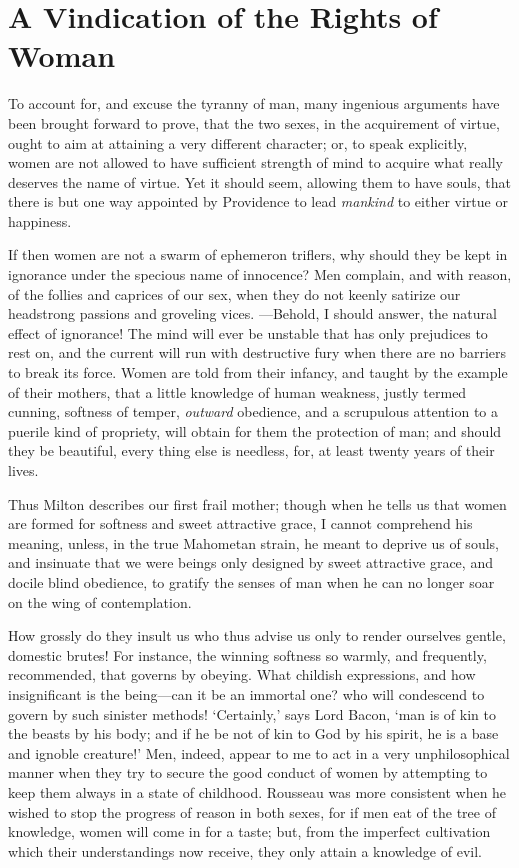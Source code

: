 
\author{Mary Wollstonecraft}
\chapter[A Vindication of the Rights of Woman, chap. 2]{A Vindication
of the Rights of Woman}

To account for, and excuse the tyranny of man, many ingenious
arguments have been brought forward to prove, that the two sexes, in
the acquirement of virtue, ought to aim at attaining a very different
character; or, to speak explicitly, women are not allowed to have
sufficient strength of mind to acquire what really deserves the name
of virtue. Yet it should seem, allowing them to have souls, that there
is but one way appointed by Providence to lead \textit{mankind} to
either virtue or happiness.

If then women are not a swarm of ephemeron triflers, why should they
be kept in ignorance under the specious name of innocence? Men
complain, and with reason, of the follies and caprices of our sex,
when they do not keenly satirize our headstrong passions and groveling
vices.  ---Be\-hold, I should answer, the natural effect of
ignorance! The mind will ever be unstable that has only prejudices to
rest on, and the current will run with destructive fury when there are
no barriers to break its force. Women are told from their infancy, and
taught by the example of their mothers, that a little knowledge of
human weakness, justly termed cunning, softness of temper,
\textit{outward} obedience, and a scrupulous attention to a puerile
kind of propriety, will obtain for them the protection of man; and
should they be beautiful, every thing else is needless, for, at least
twenty years of their lives.

Thus Milton describes our first frail mother; though when he tells us
that women are formed for softness and sweet attractive grace, I
cannot comprehend his meaning, unless, in the true Mahometan strain,
he meant to deprive us of souls, and insinuate that we were beings
only designed by sweet attractive grace, and docile blind obedience,
to gratify the senses of man when he can no longer soar on the wing of
contemplation.

How grossly do they insult us who thus advise us only to render
ourselves gentle, domestic  brutes! For instance, the winning
softness so warmly, and frequently, recommended, that governs by
obeying. What childish expressions, and how insignificant is the
be\-ing---can it be an immortal one? who will condescend to govern by
such sinister methods! `Certainly,' says Lord Bacon, `man is of kin to
the beasts by his body; and if he be not of kin to God by his spirit,
he is a base and ignoble creature!' Men, indeed, appear to me to act
in a very unphilosophical manner when they try to secure the good
conduct of women by attempting to keep them always in a state of
childhood. Rousseau was more consistent when he wished to stop the
progress of reason in both sexes, for if men eat of the tree of
knowledge, women will come in for a taste; but, from the imperfect
cultivation which their understandings now receive, they only attain a
knowledge of evil.


